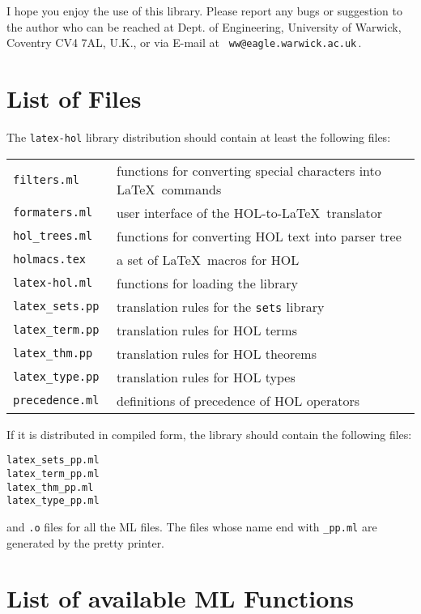 \vspace{2\bigskipamount}

I hope you enjoy the use of this library. Please report any bugs or
suggestion to the author who can be reached at Dept. of Engineering,
University of Warwick, Coventry CV4 7AL, U.K., or via E-mail at {\tt
ww@eagle.warwick.ac.uk}\,.

\appendix
\section{List of Files}

The {\tt latex-hol} library distribution should contain at least the following
files:
\begin{center}
\begin{tabular}{>{\tt}ll}
filters.ml      & functions for converting special characters into \LaTeX\ commands\\
formaters.ml    & user interface of the HOL-to-\LaTeX\ translator \\
hol\_trees.ml    & functions for converting HOL text into parser tree \\
holmacs.tex      & a set of \LaTeX\ macros for HOL \\
latex-hol.ml    & functions for loading the library \\
latex\_sets.pp   & translation rules for the {\tt sets} library \\
latex\_term.pp   & translation rules for HOL terms \\
latex\_thm.pp    & translation rules for HOL theorems \\
latex\_type.pp   & translation rules for HOL types \\
precedence.ml   & definitions of precedence of HOL operators \\
\end{tabular}
\end{center}

If it is distributed in compiled form, the library should contain the
following files:
\begin{verbatim}
latex_sets_pp.ml
latex_term_pp.ml
latex_thm_pp.ml 
latex_type_pp.ml
\end{verbatim}
and {\tt .o} files for all the ML files.
The files whose name end with {\tt \_pp.ml} are generated by the
pretty printer.

\section{List of available ML Functions}

